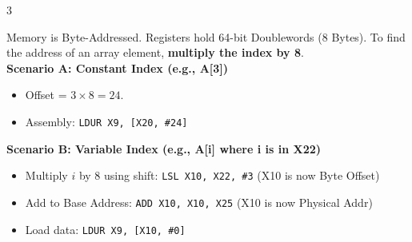 \documentclass[6pt, letterpaper]{article}
\begin{document}
\begin{multicols}{3}
\begin{tcolorbox}[colback=yellow!10, colframe=black, boxrule=0.5pt, title=\textbf{The "Times 8" Rule (Arrays \& Memory)}]
Memory is Byte-Addressed. Registers hold 64-bit Doublewords (8 Bytes). To find the address of an array element, \textbf{multiply the index by 8}. \\
\textbf{Scenario A: Constant Index (e.g., A[3])}
\begin{itemize}
    \item Offset = $3 \times 8 = 24$.
    \item Assembly: \texttt{LDUR X9, [X20, \#24]}
\end{itemize}
\textbf{Scenario B: Variable Index (e.g., A[i] where i is in X22)}
\begin{itemize}
    \item Multiply $i$ by 8 using shift: \texttt{LSL X10, X22, \#3} (X10 is now Byte Offset)
    \item Add to Base Address: \texttt{ADD X10, X10, X25} (X10 is now Physical Addr)
    \item Load data: \texttt{LDUR X9, [X10, \#0]}
\end{itemize}
\end{tcolorbox}

\end{multicols}
\end{document}

